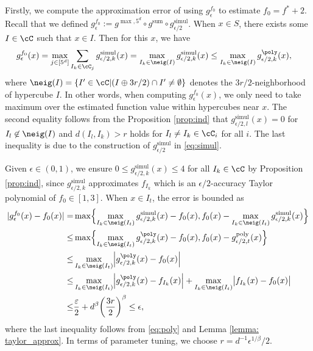 Firstly, we compute the approximation error of using $g^{f_0}_\epsilon$ to estimate $f_0=f^*+2$. Recall that we defined $g^{f_0}_\epsilon:=g^{\max,5^d} \circ g^{\text{sum}} \circ g^{\text{simul}}_{\epsilon/2}$. When $x \in S$, there exists some $I \in \cC$ such that $x \in I$. Then for this $x$, we have
\begin{align*}
    g^{f_0}_\epsilon(x) &= \max_{j \in [5^d]} \sum_{I_k \in \cC_j} g^{\text{simul}}_{\epsilon/2,k}(x)
    = \max_{I_k \in \neig(I)}  g^{\text{simul}}_{\epsilon/2,k}(x)  
    \leq \max_{I_k \in \neig(I)}  g^{\poly}_{\epsilon/2,k}(x),
\end{align*}
where $\neig(I)=\{ I' \in \cC | (I \oplus 3r/2)\cap I' \neq \emptyset \}$ denotes the $3r/2$-neighborhood of hypercube $I$. 
In other words, when computing $g^{f_0}_\epsilon(x)$, we only need to take maximum over the estimated function value within hypercubes near $x$. The second equality follows from the Proposition \ref{prop:ind} that 
 $g^{\text{simul}}_{\epsilon/2,l}(x)=0$ for $I_l \not \in \neig(I)$ and $d(I_l, I_k) > r$ holds for $I_l \neq I_k \in \cC_i$ for all $i$. The last inequality is due to the construction of $g^{\text{simul}}_{\epsilon/2}$ in \eqref{eq:simul}.

Given $\epsilon \in (0, 1)$, we ensure $0 \leq g^{\text{simul}}_{\epsilon/2,k}(x) \leq 4$ for all $I_k \in \cC$ by Proposition \ref{prop:ind}, since $g^{\text{simul}}_{\epsilon/2,k}$ approximates $f_{I_k}$ which is an $\epsilon/2$-accuracy Taylor polynomial of $f_0 \in [1, 3]$. When $x \in I_t$, the error is bounded as
\begin{align*}
    | g^{f_0}_\epsilon (x) - f_0(x) | 
    =& \max \Bigl\{  \max_{I_k \in \neig(I_t)}  g^{\text{simul}}_{\epsilon/2,k}(x) -f_0(x), f_0(x)- \max_{I_k \in \neig(I_t)}  g^{\text{simul}}_{\epsilon/2,k}(x)         \Bigr\} \\
    \leq & \max \Bigl\{  \max_{I_k \in \neig(I_t)}  g^{\poly}_{\epsilon/2,k}(x)-f_0(x), f_0(x)- g^{\text{poly}}_{\epsilon/2,t}(x) \Bigr\}\\
    \leq& \max_{I_k \in \neig(I_t)}  \Bigl| g^{\poly}_{\epsilon/2,k}(x)-f_0(x) \Bigr| \\
    \leq& \max_{I_k \in \neig(I_t)}  \Bigl| g^{\poly}_{\epsilon/2,k}(x)-f_{I_k}(x) \Bigr|
     + \max_{I_k \in \neig(I_t)}  \bigl| f_{I_k}(x) -f_0(x) \bigr| \\
    \leq& \frac{\varepsilon}{2} + d^\beta \biggl(\frac{3r}{2} \biggr)^\beta \leq \epsilon,
\end{align*}
where the last inequality follows from \eqref{eq:poly} and Lemma \ref{lemma: taylor_approx}. 
In terms of parameter tuning, we choose $r = d^{-1} \epsilon^{1/\beta}/2$. 

